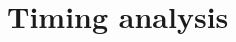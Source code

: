 \documentclass[a4paper,fleqn,usenatbib]{mnras}
\begin{document}
\section{Timing analysis} 
%
%
%
\end{document}
